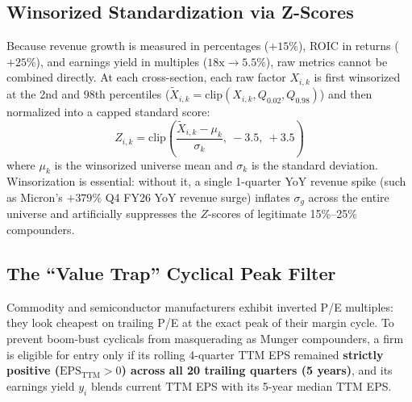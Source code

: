 \documentclass[10pt,twocolumn]{article}
\begin{document}
\subsection{Winsorized Standardization via Z-Scores}
Because revenue growth is measured in percentages ($+15\%$), ROIC in returns ($+25\%$), and earnings yield in multiples ($18\text{x} \to 5.5\%$), raw metrics cannot be combined directly. At each cross-section, each raw factor $X_{i,k}$ is first winsorized at the 2nd and 98th percentiles ($\widetilde{X}_{i,k} = \text{clip}(X_{i,k}, Q_{0.02}, Q_{0.98})$) and then normalized into a capped standard score:
\begin{equation}
    Z_{i,k} = \text{clip}\!\left(\frac{\widetilde{X}_{i,k} - \mu_k}{\sigma_k},\ -3.5,\ +3.5\right)
\end{equation}
where $\mu_k$ is the winsorized universe mean and $\sigma_k$ is the standard deviation. Winsorization is essential: without it, a single 1-quarter YoY revenue spike (such as Micron's $+379\%$ Q4 FY26 YoY revenue surge) inflates $\sigma_g$ across the entire universe and artificially suppresses the $Z$-scores of legitimate 15\%--25\% compounders.

\subsection{The ``Value Trap'' Cyclical Peak Filter}
Commodity and semiconductor manufacturers exhibit inverted P/E multiples: they look cheapest on trailing P/E at the exact peak of their margin cycle. To prevent boom-bust cyclicals from masquerading as Munger compounders, a firm is eligible for entry only if its rolling 4-quarter TTM EPS remained \textbf{strictly positive ($\text{EPS}_{\text{TTM}} > 0$) across all 20 trailing quarters (5 years)}, and its earnings yield $y_i$ blends current TTM EPS with its 5-year median TTM EPS.
\end{document}

